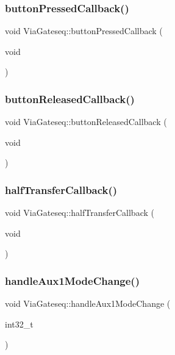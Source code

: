 \subsubsection{\texorpdfstring{button\+Pressed\+Callback()}{buttonPressedCallback()}}
{\footnotesize\ttfamily void Via\+Gateseq\+::button\+Pressed\+Callback (\begin{DoxyParamCaption}\item[{void}]{ }\end{DoxyParamCaption})}

\mbox{\label{class_via_gateseq_aa18b0d84c686c7c7339df8f9bee38e45}} 
\subsubsection{\texorpdfstring{button\+Released\+Callback()}{buttonReleasedCallback()}}
{\footnotesize\ttfamily void Via\+Gateseq\+::button\+Released\+Callback (\begin{DoxyParamCaption}\item[{void}]{ }\end{DoxyParamCaption})}

\mbox{\label{class_via_gateseq_a4760dc9a5a8b5d82d8ddb83595bff37a}} 
\subsubsection{\texorpdfstring{half\+Transfer\+Callback()}{halfTransferCallback()}}
{\footnotesize\ttfamily void Via\+Gateseq\+::half\+Transfer\+Callback (\begin{DoxyParamCaption}\item[{void}]{ }\end{DoxyParamCaption})}

\mbox{\label{class_via_gateseq_a1eb52cddac4eee6df5044e712ff679aa}} 
\subsubsection{\texorpdfstring{handle\+Aux1\+Mode\+Change()}{handleAux1ModeChange()}}
{\footnotesize\ttfamily void Via\+Gateseq\+::handle\+Aux1\+Mode\+Change (\begin{DoxyParamCaption}\item[{int32\+\_\+t}]{ }\end{DoxyParamCaption})}

